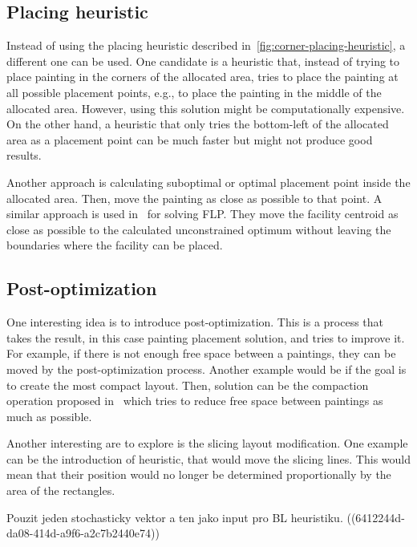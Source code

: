 \subsection{Placing heuristic}\label{subsec:placing-heuristic}

Instead of using the placing heuristic described in~\ref{fig:corner-placing-heuristic}, a different one can be used.
One candidate is a heuristic that, instead of trying to place painting in the corners of the allocated area,
tries to place the painting at all possible placement points, e.g., to place the painting in the middle of the allocated area.
However, using this solution might be computationally expensive.
On the other hand, a heuristic that only tries the bottom-left of the allocated area as a placement point can be much faster but
might not produce good results.

Another approach is calculating suboptimal or optimal placement point inside the allocated area.
Then, move the painting as close as possible to that point.
A similar approach is used in~\cite{goncalvesBiasedRandomkeyGenetic2015} for solving FLP.
They move the facility centroid as close as possible to the calculated unconstrained optimum without leaving the
boundaries where the facility can be placed.



\subsection{Post-optimization}\label{subsec:post-optimization}

One interesting idea is to introduce post-optimization.
This is a process that takes the result, in this case painting placement solution,
and tries to improve it.
For example, if there is not enough free space between a paintings, they can be moved by the post-optimization process.
Another example would be if the goal is to create the most compact layout.
Then, solution can be the compaction operation proposed in~\cite{laiSlicingTreeComplete2001}
which tries to reduce free space between paintings as much as possible.


Another interesting are to explore is the slicing layout modification.
One example can be the introduction of heuristic, that would move the slicing lines.
This would mean that their position would no longer be determined proportionally by the area of the rectangles.


Pouzit jeden stochasticky vektor a ten jako input pro BL heuristiku.
((6412244d-da08-414d-a9f6-a2c7b2440e74))








